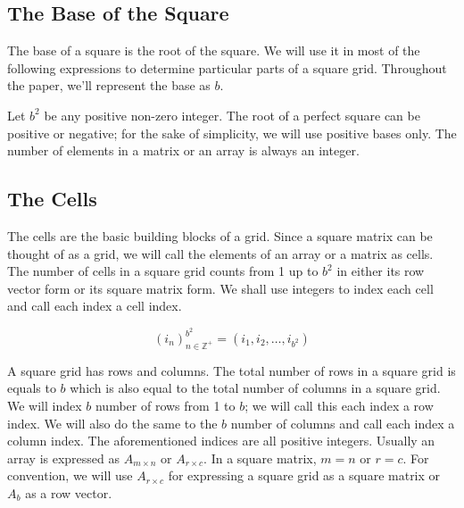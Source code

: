 \documentclass[letterpaper, twoside,12pt]{article}
\begin{document}
    \subsection{The Base of the Square} \label{base}
    The base of a square is the root of the square. We will use it in most of the following expressions to determine particular parts of a square grid. Throughout the paper, we'll represent the base as $b$. 

    Let $b^2$ be any positive non-zero integer. The root of a perfect square can be positive or negative; for the sake of simplicity, we will use positive bases only. The number of elements in a matrix or an array is always an integer.

    \subsection{The Cells} \label{cells}
    The cells are the basic building blocks of a grid. Since a square matrix can be thought of as a grid, we will call the elements of an array or a matrix as cells. The number of cells in a square grid counts from 1 up to $b^2$ in either its row vector form or its square matrix form. We shall use integers to index each cell and call each index a cell index.

    \begin{equation}
        (i_n)^{b^2}_{n\in\mathbb{Z}^+} = (i_1, i_2, \dots ,i_{b^2})
    \end{equation}

    A square grid has rows and columns. The total number of rows in a square grid is equals to $b$ which is also equal to the total number of columns in a square grid. We will index $b$ number of rows from 1 to $b$; we will call this each index a row index. We will also do the same to the $b$ number of columns and call each index a column index. The aforementioned indices are all positive integers. Usually an array is expressed as $A_{m \times n}$ or $A_{r \times c}$. In a square matrix, $m = n$ or $r = c$. For convention, we will use $A_{r \times c}$ for expressing a square grid as a square matrix or $A_{b}$ as a row vector.
\end{document}
